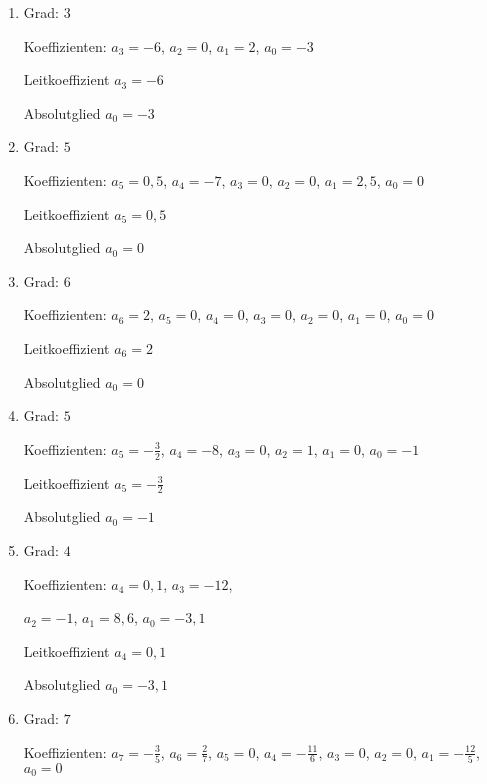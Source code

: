 \newpage
\begin{Answer}[ref=ganzHauptA1]
	
	\begin{minipage}{\textwidth}
		\begin{minipage}[t]{0.49\textwidth}
			\begin{enumerate}[label=\alph*)]
				\item Grad: \(3\)
				
				Koeffizienten: \(a_3=-6\), \(a_2=0\), \(a_1=2\), \(a_0=-3\)
				
				Leitkoeffizient \(a_3=-6\)
				
				Absolutglied \(a_0=-3\)
				\item Grad: \(5\)
				
				Koeffizienten: \(a_5=0,5\), \(a_4=-7\), \(a_3=0\), \(a_2=0\), \(a_1=2,5\), \(a_0=0\)
				
				Leitkoeffizient \(a_5=0,5\)
				
				Absolutglied \(a_0=0\)
				\item
				Grad: \(6\)
				
				Koeffizienten: \(a_6=2\), \(a_5=0\), \(a_4=0\), \(a_3=0\), \(a_2=0\), \(a_1=0\), \(a_0=0\)
				
				Leitkoeffizient \(a_6=2\)
				
				Absolutglied \(a_0=0\)
				\item Grad: \(5\)
				
				Koeffizienten: \(a_5=-\frac{3}{2}\), \(a_4=-8\), \(a_3=0\), \(a_2=1\), \(a_1=0\), \(a_0=-1\)
				
				Leitkoeffizient \(a_5=-\frac{3}{2}\)
				
				Absolutglied \(a_0=-1\)
			\end{enumerate}
		\end{minipage}%
		\begin{minipage}[t]{0.5\textwidth}
			\begin{enumerate}[label=\alph*)]
				\setcounter{enumi}{4}
				\item Grad: \(4\)
				
				Koeffizienten: \(a_4=0,1\), \(a_3=-12\),
				
				\(a_2=-1\), \(a_1=8,6\), \(a_0=-3,1\)
				
				Leitkoeffizient \(a_4=0,1\)
				
				Absolutglied \(a_0=-3,1\)
				\item Grad: \(7\)
				
				Koeffizienten: \(a_7=-\frac{3}{5}\), \(a_6=\frac{2}{7}\), \(a_5=0\), \(a_4=-\frac{11}{6}\), \(a_3=0\), \(a_2=0\), \(a_1=-\frac{12}{5}\), \(a_0=0\)
				

\end{enumerate}
\end{minipage}
\end{minipage}
\end{Answer}
